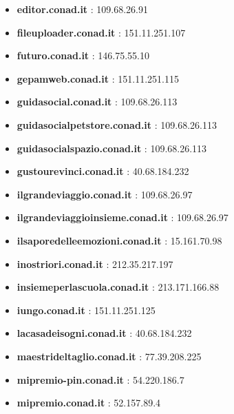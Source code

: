 \documentclass{article}
\begin{document}
\begin{itemize}
        \item \textbf{ editor.conad.it }: 109.68.26.91
    
        \item \textbf{ fileuploader.conad.it }: 151.11.251.107
    
        \item \textbf{ futuro.conad.it }: 146.75.55.10
    
        \item \textbf{ gepamweb.conad.it }: 151.11.251.115
    
        \item \textbf{ guidasocial.conad.it }: 109.68.26.113
    
        \item \textbf{ guidasocialpetstore.conad.it }: 109.68.26.113
    
        \item \textbf{ guidasocialspazio.conad.it }: 109.68.26.113
    
        \item \textbf{ gustourevinci.conad.it }: 40.68.184.232
    
        \item \textbf{ ilgrandeviaggio.conad.it }: 109.68.26.97
    
        \item \textbf{ ilgrandeviaggioinsieme.conad.it }: 109.68.26.97
    
        \item \textbf{ ilsaporedelleemozioni.conad.it }: 15.161.70.98
    
        \item \textbf{ inostriori.conad.it }: 212.35.217.197
    
        \item \textbf{ insiemeperlascuola.conad.it }: 213.171.166.88
    
        \item \textbf{ iungo.conad.it }: 151.11.251.125
    
        \item \textbf{ lacasadeisogni.conad.it }: 40.68.184.232
    
        \item \textbf{ maestrideltaglio.conad.it }: 77.39.208.225
    
        \item \textbf{ mipremio-pin.conad.it }: 54.220.186.7
    
        \item \textbf{ mipremio.conad.it }: 52.157.89.4
    

\end{itemize}
\end{document}
